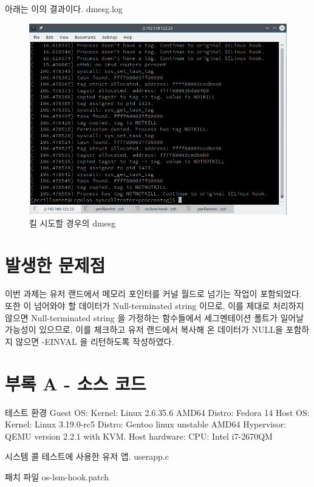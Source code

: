 \documentclass {article}
\begin{document}
아래는 이의 결과이다.
{dmesg.log}

\begin {figure}[h]
  \centering
  \includegraphics [width=120mm]{dmesg.png}
  \caption {킬 시도할 경우의 dmesg}
  \label{fig:dmesg}
\end {figure}

\section {발생한 문제점}
이번 과제는 유저 랜드에서 메모리 포인터를 커널 월드로 넘기는 작업이 포함되었다. 또한 이 넘어와야 할 데이터가 Null-terminated string 이므로, 이를 제대로 처리하지 않으면 Null-terminated string 을 가정하는 함수들에서 세그멘테이션 폴트가 일어날 가능성이 있으므로, 이를 체크하고 유저 랜드에서 복사해 온 데이터가 NULL을 포함하지 않으면 -EINVAL 을 리턴하도록 작성하였다. 

\section {부록 A - 소스 코드}
테스트 환경\newline
Guest OS:\newline
Kernel: Linux 2.6.35.6 AMD64\newline
Distro: Fedora 14\newline
\vspace{\baselineskip}
Host OS:\newline
Kernel: Linux 3.19.0-rc5\newline
Distro: Gentoo linux unstable AMD64\newline
Hypervisor: QEMU version 2.2.1 with KVM.\newline
\vspace{\baselineskip}
Host hardware:\newline
CPU: Intel i7-2670QM\newline

시스템 콜 테스트에 사용한 유저 앱.
{userapp.c}

패치 파일
{os-lsm-hook.patch}
\end{document}
